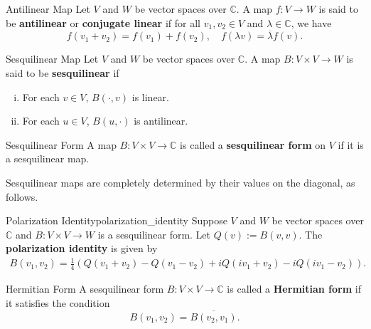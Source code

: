 \begin{definition}{Antilinear Map}{}
    Let $V$ and $W$ be vector spaces over $\mathbb{C}$. A map $f: V\to W$ is said to be \textbf{antilinear} or \textbf{conjugate linear} if for all $v_1, v_2\in V$ and $\lambda\in \mathbb{C}$, we have
    \[
        f(v_1+v_2) = f(v_1) + f(v_2),\quad f(\lambda v) = \overline{\lambda}f(v).
    \] 
\end{definition}

\begin{definition}{Sesquilinear Map}{}
    Let $V$ and $W$ be vector spaces over $\mathbb{C}$. A map $B: V\times V\to W$ is said to be \textbf{sesquilinear} if 
    \begin{enumerate}[(i)]
        \item For each $v\in V$, $B(\cdot, v)$ is linear.
        \item For each $u\in V$, $B(u, \cdot)$ is antilinear.
    \end{enumerate}
\end{definition}

\begin{definition}{Sesquilinear Form}{}
    A map $B: V\times V\to \mathbb{C}$ is called a \textbf{sesquilinear form} on $V$ if it is a sesquilinear map.
\end{definition}

Sesquilinear maps are completely determined by their values on the diagonal, as follows.
\begin{proposition}{Polarization Identity}{polarization_identity}
    Suppose $V$ and $W$ be vector spaces over $\mathbb{C}$ and $B: V\times V\to W$ is a sesquilinear form. Let $Q(v) := B(v, v)$. The \textbf{polarization identity} is given by
    \[
        \begin{aligned}
            B(v_1, v_2) = \frac{1}{4}\left(Q(v_1+v_2) - Q(v_1-v_2) + iQ(iv_1+v_2) - iQ(iv_1-v_2)\right).
        \end{aligned}
    \]
\end{proposition}

\begin{definition}{Hermitian Form}{}
    A sesquilinear form $B: V\times V\to \mathbb{C}$ is called a \textbf{Hermitian form} if it satisfies the condition
    \[
        B(v_1, v_2) = \overline{B(v_2, v_1)}.
    \]
\end{definition}

